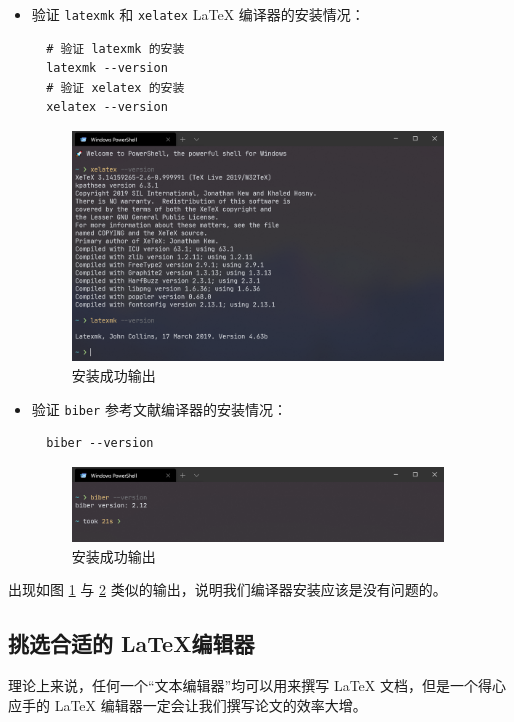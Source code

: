 \begin{itemize}
  \item 验证 \texttt{latexmk} 和 \texttt{xelatex} {\LaTeX} 编译器的安装情况：
        \begin{verbatim}
  # 验证 latexmk 的安装
  latexmk --version
  # 验证 xelatex 的安装
  xelatex --version
  \end{verbatim}
        \begin{figure}[H]
          \flushright
          \includegraphics[width=0.93\textwidth]{images/xelatex.png}
          \caption{ 安装成功输出}
          \label{xelatex}
        \end{figure}
  \item 验证 \texttt{biber} 参考文献编译器的安装情况：
        \begin{verbatim}
  biber --version
  \end{verbatim}
        \begin{figure}[H]
          \flushright
          \includegraphics[width=0.93\textwidth]{images/biber.png}
          \caption{ 安装成功输出}
          \label{biber}
        \end{figure}
\end{itemize}

出现如图 \ref{xelatex} 与 \ref{biber} 类似的输出，说明我们编译器安装应该是没有问题的。

\subsection{挑选合适的 \LaTeX 编辑器}
理论上来说，任何一个“文本编辑器”均可以用来撰写 {\LaTeX} 文档，但是一个得心应手的 {\LaTeX} 编辑器一定会让我们撰写论文的效率大增。

